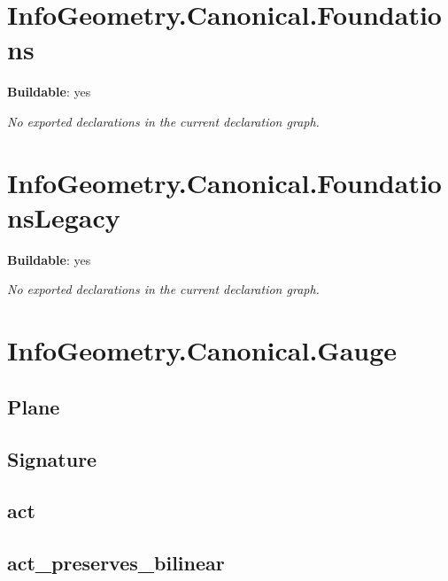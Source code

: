\section{InfoGeometry.Canonical.Foundations}

\noindent\textbf{Buildable}: yes

\noindent\emph{No exported declarations in the current declaration graph.}

\section{InfoGeometry.Canonical.FoundationsLegacy}

\noindent\textbf{Buildable}: yes

\noindent\emph{No exported declarations in the current declaration graph.}

\section{InfoGeometry.Canonical.Gauge}

\subsection*{Plane}

\begin{theorem}[blueprint="infogeometry:canonical:gauge:plane"]
\end{theorem}

\subsection*{Signature}

\begin{theorem}[blueprint="infogeometry:canonical:gauge:signature"]
\end{theorem}

\subsection*{act}

\begin{theorem}[blueprint="infogeometry:canonical:gauge:act"]
\end{theorem}

\subsection*{act_preserves_bilinear}

